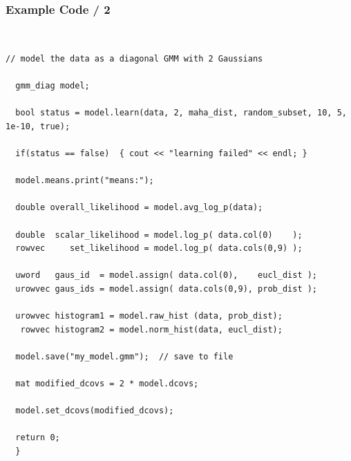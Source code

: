 \documentclass[usenames,dvipsnames]{beamer}
\begin{document}
\begin{frame}[fragile=singleslide]
\frametitle{Example Code / 2}

\begin{minipage}{1.00\textwidth}
\begin{minipage}{0.05\textwidth}
~
\end{minipage}
\begin{minipage}{0.90\textwidth}
\begin{Verbatim}[fontsize=\tiny]
  // model the data as a diagonal GMM with 2 Gaussians
  
  gmm_diag model;
  
  bool status = model.learn(data, 2, maha_dist, random_subset, 10, 5, 1e-10, true);
  
  if(status == false)  { cout << "learning failed" << endl; }
  
  model.means.print("means:");
  
  double overall_likelihood = model.avg_log_p(data);
  
  double  scalar_likelihood = model.log_p( data.col(0)    );
  rowvec     set_likelihood = model.log_p( data.cols(0,9) );
  
  uword   gaus_id  = model.assign( data.col(0),    eucl_dist );
  urowvec gaus_ids = model.assign( data.cols(0,9), prob_dist );
  
  urowvec histogram1 = model.raw_hist (data, prob_dist);
   rowvec histogram2 = model.norm_hist(data, eucl_dist);
  
  model.save("my_model.gmm");  // save to file
  
  mat modified_dcovs = 2 * model.dcovs;
  
  model.set_dcovs(modified_dcovs);
  
  return 0;
  }
\end{Verbatim}
\end{minipage}
\end{minipage}
\end{frame}

%
%
%
\end{document}
